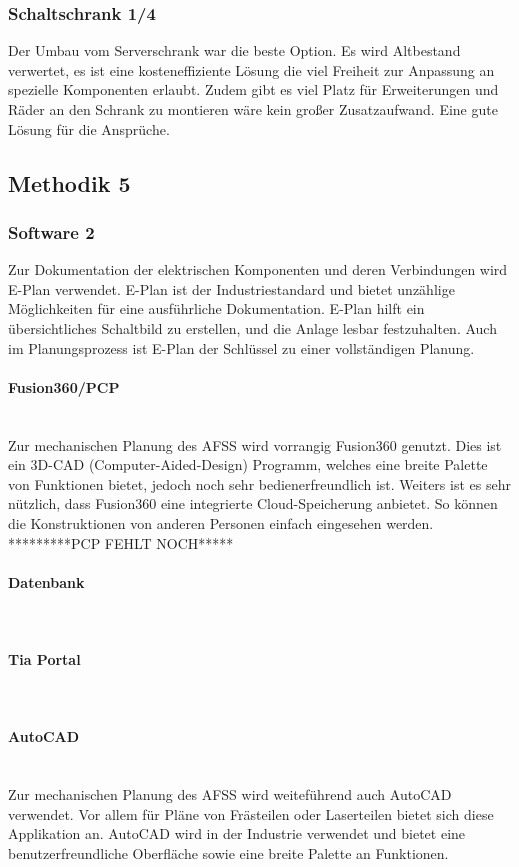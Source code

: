 \subsubsection{Schaltschrank 1/4}
Der Umbau vom Serverschrank war die beste Option. Es wird Altbestand verwertet, es ist eine kosteneffiziente Lösung die viel Freiheit zur Anpassung an spezielle Komponenten erlaubt. Zudem gibt es viel Platz für Erweiterungen und Räder an den Schrank zu montieren wäre kein großer Zusatzaufwand. 
Eine gute Lösung für die Ansprüche.

\subsection{Methodik 5}

\subsubsection{Software 2}

Zur Dokumentation der elektrischen Komponenten und deren Verbindungen wird E-Plan verwendet. E-Plan ist der Industriestandard und bietet unzählige Möglichkeiten für eine ausführliche Dokumentation. E-Plan hilft ein übersichtliches Schaltbild zu erstellen, und die Anlage lesbar festzuhalten. Auch im Planungsprozess ist E-Plan der Schlüssel zu einer vollständigen Planung.
\paragraph{Fusion360/PCP}\mbox{}\\
Zur mechanischen Planung des AFSS wird vorrangig Fusion360 genutzt. Dies ist ein 3D-CAD (Computer-Aided-Design) Programm, welches eine breite Palette von Funktionen bietet, jedoch noch sehr bedienerfreundlich ist. Weiters ist es sehr nützlich, dass Fusion360 eine integrierte Cloud-Speicherung anbietet. So können die Konstruktionen von anderen Personen einfach eingesehen werden. *********PCP FEHLT NOCH*****
\paragraph{Datenbank}\mbox{}\\
\paragraph{Tia Portal}\mbox{}\\
\paragraph{AutoCAD}\mbox{}\\
Zur mechanischen Planung des AFSS wird weiteführend auch AutoCAD verwendet. Vor allem für Pläne von Frästeilen oder Laserteilen bietet sich diese Applikation an. AutoCAD wird in der Industrie verwendet und bietet eine benutzerfreundliche Oberfläche sowie eine breite Palette an Funktionen.
